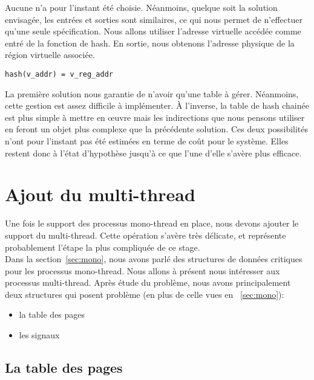       Aucune n'a pour l'instant été choisie. Néanmoins, quelque soit la solution
      envisagée, les entrées et sorties sont similaires, ce qui nous permet de
      n'effectuer qu'une seule spécification. Nous allons utiliser l'adresse
      virtuelle accédée comme entré de la fonction de hash. En sortie, nous
      obtenons l'adresse physique de la région virtuelle associée.

      \begin{center}
        \texttt{hash(v\_addr) = v\_reg\_addr}
      \end{center}

      La première solution nous garantie de n'avoir qu'une table à
      gérer. Néanmoins, cette gestion est assez difficile à implémenter. À
      l'inverse, la table de hash chainée est plus simple à mettre en \oe uvre
      mais les indirections que nous pensons utiliser en feront un objet plus
      complexe que la précédente solution. Ces deux possibilités n'ont pour
      l'instant pas été estimées en terme de coût pour le système. Elles restent
      donc à l'état d'hypothèse jusqu'à ce que l'une d'elle s'avère plus
      efficace.


  \section{Ajout du multi-thread}
  \label{sec:multi}  

    Une fois le support des processus mono-thread en place, nous devons ajouter
    le support du multi-thread. Cette opération s'avère très délicate, et
    représente probablement l'étape la plus compliquée de ce stage.\\

    Dans la section~\ref{sec:mono}, nous avons parlé des structures de données
    critiques pour les processus mono-thread. Nous allons à présent nous
    intéresser aux processus multi-thread. Après étude du problème, nous avons
    principalement deux structures qui posent problème (en plus de celle vues en
    ~\ref{sec:mono}):
    \begin{itemize}
      \item la table des pages
      \item les signaux
    \end{itemize}  

    \subsection{La table des pages}

